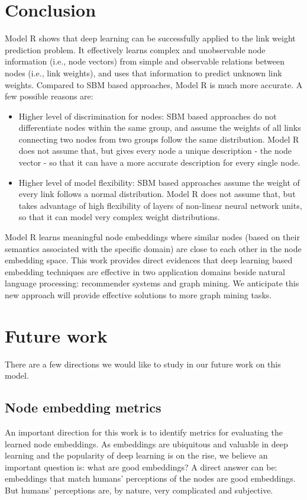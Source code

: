 \documentclass[11pt,twocolumn]{article}
\begin{document}
\section{Conclusion}
Model R shows that deep learning can be successfully applied to the link weight prediction problem.
It effectively learns complex and unobservable node information (i.e., node vectors) from simple and observable relations between nodes (i.e., link weights),
and uses that information to predict unknown link weights.
Compared to SBM based approaches, Model R is much more accurate.
A few possible reasons are:
\begin{itemize}
	\item Higher level of discrimination for nodes:
	SBM based approaches do not differentiate nodes within the same group,
	and assume the weights of all links connecting two nodes from two groups
	follow the same distribution.
	Model R does not assume that,
	but gives every node a unique description - the node vector - so that
	it can have a more accurate description for every single node.
	\item Higher level of model flexibility:
	SBM based approaches assume the weight of every link follows
	a normal distribution.
	Model R does not assume that, but takes advantage of high flexibility of
	layers of non-linear neural network units,
	so that it can model very complex weight distributions.
\end{itemize}
Model R learns meaningful node embeddings where similar nodes (based on their semantics associated with the specific domain) are close to each other in the node embedding space.
This work provides direct evidences that deep learning based embedding techniques are effective in two application domains beside natural language processing: recommender systems and graph mining.
We anticipate this new approach will provide effective solutions to more
graph mining tasks.

\section{Future work}
There are a few directions we would like to study in our future work on this model.

\subsection{Node embedding metrics}
An important direction for this work is to identify metrics for evaluating the learned node embeddings.
As embeddings are ubiquitous and valuable in deep learning and the popularity of deep learning is on the rise, we believe an important question is: what are good embeddings?
A direct answer can be: embeddings that match humans' perceptions of the nodes are good embeddings.
But humans' perceptions are, by nature, very complicated and subjective.
\end{document}
